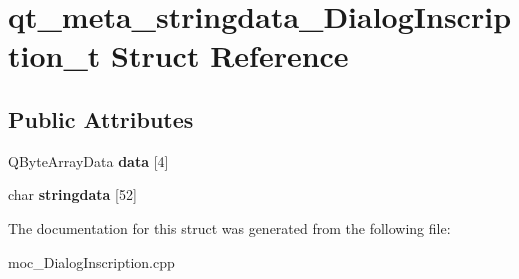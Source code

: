 \section{qt\-\_\-meta\-\_\-stringdata\-\_\-\-Dialog\-Inscription\-\_\-t Struct Reference}
\label{structqt__meta__stringdata___dialog_inscription__t}
\subsection*{Public Attributes}
\begin{DoxyCompactItemize}
\item 
Q\-Byte\-Array\-Data {\bfseries data} [4]\label{structqt__meta__stringdata___dialog_inscription__t_accd7a91b4127e953a15d453b9049f1a5}

\item 
char {\bfseries stringdata} [52]\label{structqt__meta__stringdata___dialog_inscription__t_ae562ffcac5da0e96031daf68f0084595}

\end{DoxyCompactItemize}


The documentation for this struct was generated from the following file\-:\begin{DoxyCompactItemize}
\item 
moc\-\_\-\-Dialog\-Inscription.\-cpp\end{DoxyCompactItemize}
